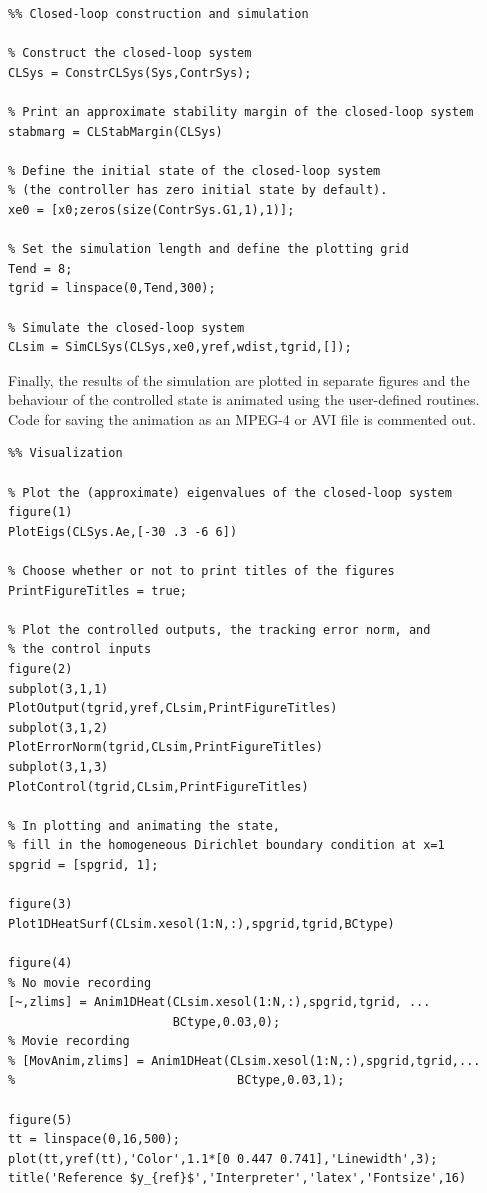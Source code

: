 \documentclass[11pt, a4paper]{amsart}
\theoremstyle{definition}
\numberwithin{equation}{section}
\begin{document}
\begin{lstlisting}
%% Closed-loop construction and simulation

% Construct the closed-loop system
CLSys = ConstrCLSys(Sys,ContrSys);

% Print an approximate stability margin of the closed-loop system
stabmarg = CLStabMargin(CLSys)

% Define the initial state of the closed-loop system
% (the controller has zero initial state by default).
xe0 = [x0;zeros(size(ContrSys.G1,1),1)];

% Set the simulation length and define the plotting grid
Tend = 8;
tgrid = linspace(0,Tend,300);

% Simulate the closed-loop system
CLsim = SimCLSys(CLSys,xe0,yref,wdist,tgrid,[]);
\end{lstlisting}

Finally, the results of the simulation are plotted in separate figures and the behaviour of the controlled state is animated using the user-defined routines. Code for saving the animation as an MPEG-4 or AVI file is commented out.

\begin{lstlisting}
%% Visualization

% Plot the (approximate) eigenvalues of the closed-loop system
figure(1)
PlotEigs(CLSys.Ae,[-30 .3 -6 6])

% Choose whether or not to print titles of the figures
PrintFigureTitles = true;

% Plot the controlled outputs, the tracking error norm, and 
% the control inputs
figure(2)
subplot(3,1,1)
PlotOutput(tgrid,yref,CLsim,PrintFigureTitles)
subplot(3,1,2)
PlotErrorNorm(tgrid,CLsim,PrintFigureTitles)
subplot(3,1,3)
PlotControl(tgrid,CLsim,PrintFigureTitles)

% In plotting and animating the state,
% fill in the homogeneous Dirichlet boundary condition at x=1
spgrid = [spgrid, 1];

figure(3)
Plot1DHeatSurf(CLsim.xesol(1:N,:),spgrid,tgrid,BCtype)

figure(4)
% No movie recording
[~,zlims] = Anim1DHeat(CLsim.xesol(1:N,:),spgrid,tgrid, ...
                       BCtype,0.03,0);
% Movie recording
% [MovAnim,zlims] = Anim1DHeat(CLsim.xesol(1:N,:),spgrid,tgrid,...
%                               BCtype,0.03,1);

figure(5)
tt = linspace(0,16,500);
plot(tt,yref(tt),'Color',1.1*[0 0.447 0.741],'Linewidth',3);
title('Reference $y_{ref}$','Interpreter','latex','Fontsize',16)
\end{lstlisting}
\end{document}
